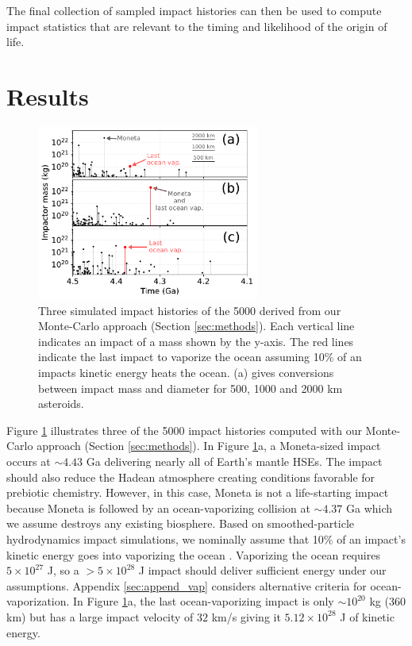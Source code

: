 \documentclass[manuscript]{aastex63}
\begin{document}
The final collection of sampled impact histories can then be used to compute impact statistics that are relevant to the timing and likelihood of the origin of life.

\section{Results} \label{sec:results}

\begin{figure}
  \centering
  \includegraphics[width=0.65\textwidth]{figures/example_impact_histories.pdf}
  \caption{Three simulated impact histories of the 5000 derived from our Monte-Carlo approach (Section \ref{sec:methods}). Each vertical line indicates an impact of a mass shown by the y-axis. The red lines indicate the last impact to vaporize the ocean assuming 10\% of an impacts kinetic energy heats the ocean. (a) gives conversions between impact mass and diameter for 500, 1000 and 2000 km asteroids.}
  \label{fig:example_impact_histories}
\end{figure}

Figure \ref{fig:example_impact_histories} illustrates three of the 5000 impact histories computed with our Monte-Carlo approach (Section \ref{sec:methods}). In Figure \ref{fig:example_impact_histories}a, a Moneta-sized impact occurs at $\sim 4.43$ Ga delivering nearly all of Earth's mantle HSEs. The impact should also reduce the Hadean atmosphere creating conditions favorable for prebiotic chemistry. However, in this case, Moneta is not a life-starting impact because Moneta is followed by an ocean-vaporizing collision at $\sim 4.37$ Ga which we assume destroys any existing biosphere. Based on smoothed-particle hydrodynamics impact simulations, we nominally assume that 10\% of an impact's kinetic energy goes into vaporizing the ocean \citep[Appendix \ref{sec:append_vap},][]{Citron_2022}. Vaporizing the ocean requires $5 \times 10^{27}$ J, so a $> 5 \times 10^{28}$ J impact should deliver sufficient energy under our assumptions. Appendix \ref{sec:append_vap} considers alternative criteria for ocean-vaporization. In Figure \ref{fig:example_impact_histories}a, the last ocean-vaporizing impact is only $\sim 10^{20}$ kg (360 km) but has a large impact velocity of $32$ km/s giving it $5.12 \times 10^{28}$ J of kinetic energy. 
\end{document}
